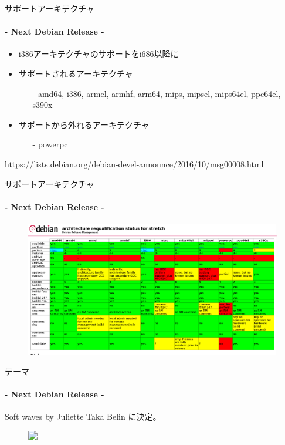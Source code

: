 \documentclass[cjk,dvipdfmx,14pt,compress,fragile]{beamer}
\begin{document}
\begin{frame}[c,fragile]{サポートアーキテクチャ}
  \framesubtitle{- Next Debian Release -}
  \pause
  \begin{itemize}[<+->]
  \item %
    i386アーキテクチャのサポートをi686以降に
  \item %
    サポートされるアーキテクチャ
    \begin{itemize}[<+->]
    \item[-] %
      amd64, i386, armel, armhf, arm64, mips, mipsel, \alert{mips64el}, ppc64el, s390x
    \end{itemize}
  \item %
    サポートから外れるアーキテクチャ
    \begin{itemize}[<+->]
    \item[-] %
      powerpc
    \end{itemize}
  \end{itemize}
  \begin{flushright}
    \tiny{\url{https://lists.debian.org/debian-devel-announce/2016/10/msg00008.html}}
  \end{flushright}
\end{frame}

\begin{frame}[c,fragile]{サポートアーキテクチャ}
  \framesubtitle{- Next Debian Release -}
  \begin{figure}
    \centering
    \includegraphics[width=.9\textwidth]{image201611/stretch-arch-requalification.png}
  \end{figure}
\end{frame}

\begin{frame}[c,fragile]{テーマ}
  \framesubtitle{- Next Debian Release -}
  \pause
  Soft waves by Juliette Taka Belin に決定。
  \begin{figure}
    \centering
    \includegraphics<2->[width=0.65\textwidth]{image201701/wallpaper.png}
  \end{figure}
\end{frame}
\end{document}

